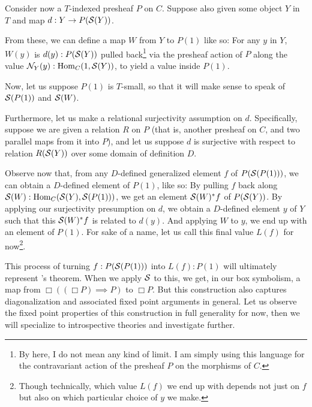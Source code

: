 Consider now a $T$-indexed presheaf $P$ on $C$. Suppose also given some object $Y$ in $T$ and map $d : Y \to P(\mathcal{S}(Y))$.

From these, we can define a map $W$ from $Y$ to $P(1)$ like so: For any $y$ in $Y$, $W(y)$ is $d(y) : P(\mathcal{S}(Y))$ pulled back\footnote{By  here, I do not mean any kind of limit. I am simply using this language for the contravariant action of the presheaf $P$ on the morphisms of $C$.} via the presheaf action of $P$ along the value $\mathcal{N}_Y(y) : \operatorname{Hom}_C(1, \mathcal{S}(Y))$, to yield a value inside $P(1)$.

Now, let us suppose $P(1)$ is $T$-small, so that it will make sense to speak of $\mathcal{S}(P(1))$ and $\mathcal{S}(W)$.

Furthermore, let us make a relational surjectivity assumption on $d$. Specifically, suppose we are given a relation $R$ on $P$ (that is, another presheaf on $C$, and two parallel maps from it into $P$), and let us suppose $d$ is surjective with respect to relation $R(\mathcal{S}(Y))$ over some domain of definition $D$.

Observe now that, from any $D$-defined generalized element $f$ of $P(\mathcal{S}(P(1)))$, we can obtain a $D$-defined element of $P(1)$, like so: By pulling $f$ back along $\mathcal{S}(W) : \operatorname{Hom}_C(\mathcal{S}(Y), \mathcal{S}(P(1)))$, we get an element $\mathcal{S}(W)^*f$ of $P(\mathcal{S}(Y))$. By applying our surjectivity presumption on $d$, we obtain a $D$-defined element $y$ of $Y$ such that this $\mathcal{S}(W)^*f$ is related to $d(y)$. And applying $W$ to $y$, we end up with an element of $P(1)$. For sake of a name, let us call this final value $L(f)$ for now\footnote{Though technically, which value $L(f)$ we end up with depends not just on $f$ but also on which particular choice of $y$ we make.}.

This process of turning $f: P(\mathcal{S}(P(1)))$ into $L(f): P(1)$ will ultimately represent \Loeb's theorem. When we apply $\mathcal{S}$ to this, we get, in our box symbolism, a map from $\Box((\Box P) \implies P)$ to $\Box P$. But this construction also captures diagonalization and associated fixed point arguments in general. Let us observe the fixed point properties of this construction in full generality for now, then we will specialize to introspective theories and investigate further.

